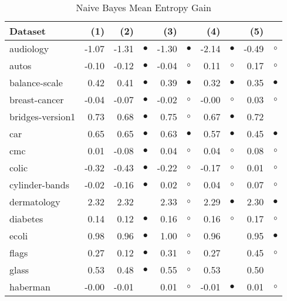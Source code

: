 \begin{table}[htb]
\caption{\label{nbmeg}Naive Bayes Mean Entropy Gain}
\footnotesize
{\centering \begin{tabular}{lrr@{\hspace{0.1cm}}cr@{\hspace{0.1cm}}cr@{\hspace{0.1cm}}cr@{\hspace{0.1cm}}c}
\\
\hline
Dataset & (1)& (2) & & (3) & & (4) & & (5) & \\
\hline
audiology & -1.07 & -1.31 & $\bullet$ & -1.30 & $\bullet$ & -2.14 & $\bullet$ & -0.49 &    $\circ$\\
autos & -0.10 & -0.12 & $\bullet$ & -0.04 &   $\circ$ &  0.11 &   $\circ$ &  0.17 &    $\circ$\\
balance-scale &  0.42 &  0.41 & $\bullet$ &  0.39 & $\bullet$ &  0.32 & $\bullet$ &  0.35 &  $\bullet$\\
breast-cancer & -0.04 & -0.07 & $\bullet$ & -0.02 &   $\circ$ & -0.00 &   $\circ$ &  0.03 &    $\circ$\\
bridges-version1 &  0.73 &  0.68 & $\bullet$ &  0.75 &   $\circ$ &  0.67 & $\bullet$ &  0.72 &           \\
car &  0.65 &  0.65 & $\bullet$ &  0.63 & $\bullet$ &  0.57 & $\bullet$ &  0.45 &  $\bullet$\\
cmc &  0.01 & -0.08 & $\bullet$ &  0.04 &   $\circ$ &  0.04 &   $\circ$ &  0.08 &    $\circ$\\
colic & -0.32 & -0.43 & $\bullet$ & -0.22 &   $\circ$ & -0.17 &   $\circ$ &  0.01 &    $\circ$\\
cylinder-bands & -0.02 & -0.16 & $\bullet$ &  0.02 &   $\circ$ &  0.04 &   $\circ$ &  0.07 &    $\circ$\\
dermatology &  2.32 &  2.32 &           &  2.33 &   $\circ$ &  2.29 & $\bullet$ &  2.30 &  $\bullet$\\
diabetes &  0.14 &  0.12 & $\bullet$ &  0.16 &   $\circ$ &  0.16 &   $\circ$ &  0.17 &    $\circ$\\
ecoli &  0.98 &  0.96 & $\bullet$ &  1.00 &   $\circ$ &  0.96 &           &  0.95 &  $\bullet$\\
flags &  0.27 &  0.12 & $\bullet$ &  0.31 &   $\circ$ &  0.27 &           &  0.45 &    $\circ$\\
glass &  0.53 &  0.48 & $\bullet$ &  0.55 &   $\circ$ &  0.53 &           &  0.50 &           \\
haberman & -0.00 & -0.01 &           &  0.01 &   $\circ$ & -0.01 & $\bullet$ &  0.01 &    $\circ$\\

\end{tabular}}
\end{table}
